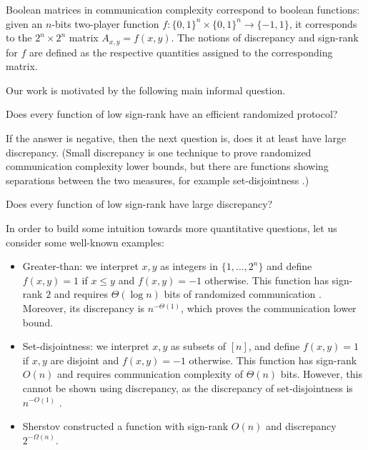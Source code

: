 Boolean matrices in communication complexity correspond to boolean functions:
given an $n$-bits %
two-player  %
function $f:\{0,1\}^n \times \{0,1\}^n \to \{-1,1\}$, it corresponds to the $2^n \times 2^n$ matrix $A_{x,y}=f(x,y)$. The notions of discrepancy and sign-rank
for $f$ %
%
are defined as the respective quantities assigned to the
corresponding matrix.

%
%
Our work is motivated by the following main informal question.  %
\begin{problem}
Does every function of low sign-rank have an efficient randomized protocol?
\end{problem}

If the answer is negative, then the next question is, does it at least have 
large %
discrepancy.  (Small   %
discrepancy is one technique to prove randomized communication complexity lower bounds, but there are functions showing separations between the two measures,
for example set-disjointness \cite{chattopadhyay2010story}.)  %


\begin{problem}
Does every function of low sign-rank have large discrepancy?
\end{problem}

In order to build some intuition towards more quantitative questions, 
let us consider some well-known examples:


\begin{itemize}
\item Greater-than: we interpret $x,y$ as integers in $\{1,\ldots,2^n\}$ and define $f(x,y) = 1$ if $x \le y$ and $f(x,y)=-1$ otherwise. This function has sign-rank $2$ and requires $\Theta(\log n)$ bits of randomized communication \cite{nisan1993communication}. Moreover, its discrepancy is $n^{-\Theta(1)}$, which proves the communication lower bound.

\item Set-disjointness: we interpret $x,y$ as subsets of $[n]$, and define $f(x,y)=1$ if $x,y$ are disjoint and $f(x,y)=-1$ otherwise. This function has sign-rank $O(n)$ and requires communication complexity of $\Theta(n)$ bits. However, this cannot be shown using discrepancy, as the discrepancy of set-disjointness is $n^{-O(1)}$ \cite{chattopadhyay2010story}.

\item Sherstov \cite{hardestSher} constructed a function with sign-rank $O(n)$ and discrepancy $2^{-\Omega(n)}$.
\end{itemize}

